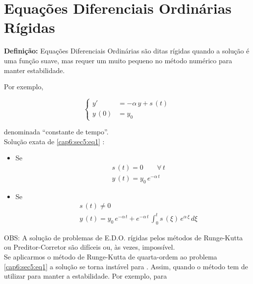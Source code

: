 \section{Equações Diferenciais Ordinárias Rígidas}

\textbf{Definição:} Equações Diferenciais Ordinárias são ditas rígidas quando a solução é uma função suave, mas requer um  muito pequeno no método numérico para manter estabilidade.

Por exemplo,

\begin{equation}
 \label{cap6:sec5:eq1}
 \left\{
 \begin{array}{ll}
  y'       & = - \alpha \, y + s \, (t) \\
  y \, (0) & = y_0
 \end{array}
 \right.
\end{equation}

 denominada ``constante de tempo''.\\

Solução exata de \ref{cap6:sec5:eq1} :

\begin{itemize}

\item Se
\begin{eqnarray}
 && s \, (t) = 0 \qquad \forall \, t \nonumber \\
 \label{cap6:sec5:eq2}
 && y \, (t) = y_0 \, e^{-\alpha \, t}
\end{eqnarray}

\item Se
\begin{eqnarray}
 && s \, (t) \neq 0 \nonumber \\
 \label{cap6:sec5:eq3}
 && y \, (t) = y_0 \, e^{-\alpha \, t} + e^{-\alpha \, t} \, \int^t_0 s \, (\xi) \, e^{\alpha \, \xi} \, d\xi
\end{eqnarray}

\end{itemize}

OBS: A solução de problemas de E.D.O. rígidas pelos métodos de Runge-Kutta ou Preditor-Corretor são difíceis ou, às vezes, impossível.\\

Se aplicarmos o método de Runge-Kutta de quarta-ordem ao problema \ref{cap6:sec5:eq1} a solução se torna instável para . Assim, quando  o método tem de utilizar  para manter a estabilidade. Por exemplo, para

